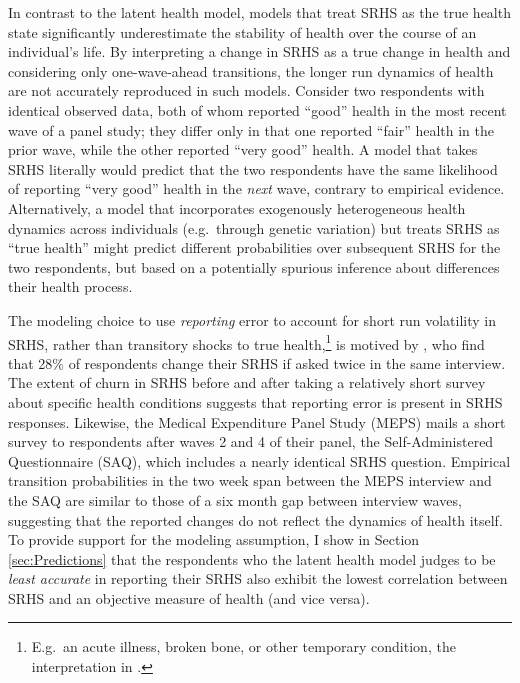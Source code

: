 \documentclass[12pt,pdftex,letterpaper]{article}
\begin{document}
In contrast to the latent health model, models that treat SRHS as the true health state significantly underestimate the stability of health over the course of an individual's life. By interpreting a change in SRHS as a true change in health and considering only one-wave-ahead transitions, the longer run dynamics of health are not accurately reproduced in such models. Consider two respondents with identical observed data, both of whom reported ``good'' health in the most recent wave of a panel study; they differ only in that one reported ``fair'' health in the prior wave, while the other reported ``very good'' health. A model that takes SRHS literally would predict that the two respondents have the same likelihood of reporting ``very good'' health in the \textit{next} wave, contrary to empirical evidence. Alternatively, a model that incorporates exogenously heterogeneous health dynamics across individuals (e.g.\ through genetic variation) but treats SRHS as ``true health'' might predict different probabilities over subsequent SRHS for the two respondents, but based on a potentially spurious inference about differences their health process.

The modeling choice to use \textit{reporting} error to account for short run volatility in SRHS, rather than transitory shocks to true health,\footnote{E.g.\ an acute illness, broken bone, or other temporary condition, the interpretation in \cite{Halliday11}.} is motived by \cite{Crossley02}, who find that 28\% of respondents change their SRHS if asked twice in the same interview.  The extent of churn in SRHS before and after taking a relatively short survey about specific health conditions suggests that reporting error is present in SRHS responses. Likewise, the Medical Expenditure Panel Study (MEPS) mails a short survey to respondents after waves 2 and 4 of their panel, the Self-Administered Questionnaire (SAQ), which includes a nearly identical SRHS question. Empirical transition probabilities in the two week span between the MEPS interview and the SAQ are similar to those of a six month gap between interview waves, suggesting that the reported changes do not reflect the dynamics of health itself. To provide support for the modeling assumption, I show in Section \ref{sec:Predictions} that the respondents who the latent health model judges to be \textit{least accurate} in reporting their SRHS also exhibit the lowest correlation between SRHS and an objective measure of health (and vice versa).
\end{document}

